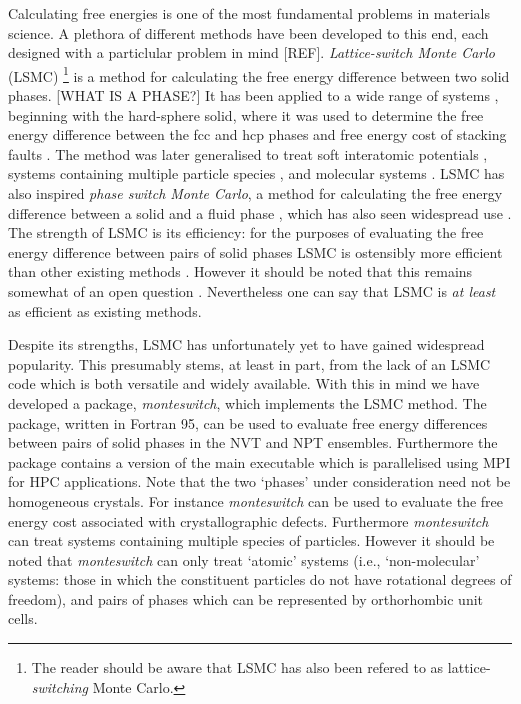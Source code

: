 \documentclass{report}
\begin{document}
Calculating free energies is one of the most fundamental problems in materials science.
A plethora of different methods have been developed to this end, each designed with a particlular problem in mind [REF].
%
\emph{Lattice-switch Monte Carlo} (LSMC) \cite{Bruce_1997,Bruce_2000} 
\footnote{The reader should be aware that LSMC has also been refered to as lattice-\emph{switching} Monte Carlo.}
is a method for calculating the free energy difference between two solid phases. [WHAT IS A PHASE?]
%
It has been applied to a wide range of systems \cite{Bruce_1997,Bruce_2000,Pronk_1999,Mau_1999,Jackson_2002,Wilms_2012,Jackson_2007,Yang_2008,
Marechal_2008,Raiteri_2010,Quigley_2014,Bridgwater_2014},
beginning with the hard-sphere solid, where it was used to determine the free energy difference
between the fcc and hcp phases \cite{Bruce_1997,Bruce_2000} and free energy cost of stacking faults
\cite{Pronk_1999,Mau_1999}. The method was later generalised to treat soft interatomic potentials \cite{Jackson_2002,Wilms_2012}, systems containing multiple
particle species \cite{Jackson_2007,Yang_2008}, and molecular systems \cite{Marechal_2008,Raiteri_2010,Quigley_2014,Bridgwater_2014}.
LSMC has also inspired \emph{phase switch Monte Carlo}, a method for calculating the free energy difference between a solid and a
fluid phase \cite{Wilding_2000}, which has also seen widespread use
\cite{Wilding_2000,Errington_2004,McNeil-Watson_2006,Wilding_2009_MP,Wilding_2009_JCP,Sollich_2010,Wilding_2010}.
%
The strength of LSMC is its efficiency: for the purposes of evaluating the free energy difference between pairs of solid phases LSMC is ostensibly
more efficient than other existing methods \cite{Wilms_2012,Marechal_2008}. 
However it should be noted that this remains somewhat of an open question \cite{Pronk_1999}. Nevertheless one can say that LSMC is 
\emph{at least} as efficient as existing methods. 

Despite its strengths, LSMC has unfortunately yet to have gained widespread popularity. This 
presumably stems, at least in part, from the lack of an LSMC code which is both versatile and widely available.
%
With this in mind we have developed a package, \emph{monteswitch}, which implements the LSMC method. The package, written in Fortran 95, can 
be used to evaluate free energy differences between pairs of solid phases in the NVT and NPT ensembles. Furthermore the
package contains a version of the main executable which is parallelised using MPI for HPC applications.
Note that the two `phases' under consideration need not be homogeneous crystals. For instance \emph{monteswitch} can be used to evaluate the 
free energy cost associated with crystallographic defects. Furthermore \emph{monteswitch} can treat systems containing multiple species of particles.
However it should be noted that \emph{monteswitch} can only treat `atomic' systems (i.e., `non-molecular' systems: those in which the constituent 
particles do not have rotational degrees of freedom), and pairs of phases which can be represented by orthorhombic unit cells.
\end{document}

